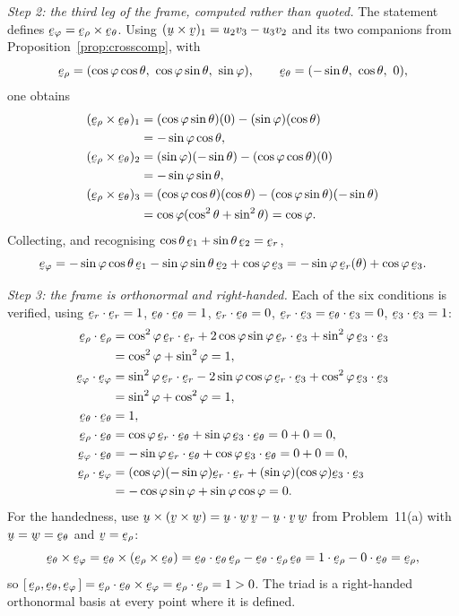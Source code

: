 \begin{solution}
\emph{Step 2: the third leg of the frame, computed rather than quoted.}
The statement defines $\beph=\berho\times\beth$. Using
$(\bu\times\bv)_{1}=u_{2}v_{3}-u_{3}v_{2}$ and its two companions from
Proposition~\ref{prop:crosscomp}, with
\[
   \berho=(\cos\varphi\cos\theta,\ \cos\varphi\sin\theta,\ \sin\varphi),
   \qquad
   \beth=(-\sin\theta,\ \cos\theta,\ 0),
\]
one obtains
\[
\begin{aligned}
   (\berho\times\beth)_{1}
   &=(\cos\varphi\sin\theta)(0)-(\sin\varphi)(\cos\theta)\\
   &=-\sin\varphi\cos\theta,\\
   (\berho\times\beth)_{2}
   &=(\sin\varphi)(-\sin\theta)-(\cos\varphi\cos\theta)(0)\\
   &=-\sin\varphi\sin\theta,\\
   (\berho\times\beth)_{3}
   &=(\cos\varphi\cos\theta)(\cos\theta)-(\cos\varphi\sin\theta)(-\sin\theta)\\
   &=\cos\varphi(\cos^{2}\theta+\sin^{2}\theta)=\cos\varphi .
\end{aligned}
\]
Collecting, and recognising $\cos\theta\,\be_{1}+\sin\theta\,\be_{2}=\ber$,
\[
   \beph=-\sin\varphi\cos\theta\,\be_{1}-\sin\varphi\sin\theta\,\be_{2}
         +\cos\varphi\,\be_{3}
        =-\sin\varphi\,\ber(\theta)+\cos\varphi\,\be_{3}.
\]

\emph{Step 3: the frame is orthonormal and right-handed.}
Each of the six conditions is verified, using
$\ip\ber\ber=1$, $\ip\beth\beth=1$, $\ip\ber\beth=0$,
$\ip\ber{\be_{3}}=\ip\beth{\be_{3}}=0$, $\ip{\be_{3}}{\be_{3}}=1$:
\[
\begin{aligned}
   \ip\berho\berho&=\cos^{2}\varphi\,\ip\ber\ber
     +2\cos\varphi\sin\varphi\,\ip\ber{\be_{3}}
     +\sin^{2}\varphi\,\ip{\be_{3}}{\be_{3}}\\
     &=\cos^{2}\varphi+\sin^{2}\varphi=1,\\
   \ip\beph\beph&=\sin^{2}\varphi\,\ip\ber\ber
     -2\sin\varphi\cos\varphi\,\ip\ber{\be_{3}}
     +\cos^{2}\varphi\,\ip{\be_{3}}{\be_{3}}\\
     &=\sin^{2}\varphi+\cos^{2}\varphi=1,\\
   \ip\beth\beth&=1,\\
   \ip\berho\beth&=\cos\varphi\,\ip\ber\beth
     +\sin\varphi\,\ip{\be_{3}}\beth=0+0=0,\\
   \ip\beph\beth&=-\sin\varphi\,\ip\ber\beth
     +\cos\varphi\,\ip{\be_{3}}\beth=0+0=0,\\
   \ip\berho\beph&=(\cos\varphi)(-\sin\varphi)\ip\ber\ber
     +(\sin\varphi)(\cos\varphi)\ip{\be_{3}}{\be_{3}}\\
     &=-\cos\varphi\sin\varphi+\sin\varphi\cos\varphi=0 .
\end{aligned}
\]
For the handedness, use
$\bu\times(\bv\times\bw)=\ip\bu\bw\,\bv-\ip\bu\bv\,\bw$ from
Problem~11(a) with $\bu=\bw=\beth$ and $\bv=\berho$:
\[
   \beth\times\beph=\beth\times(\berho\times\beth)
   =\ip\beth\beth\,\berho-\ip\beth\berho\,\beth
   =1\cdot\berho-0\cdot\beth=\berho,
\]
so $\tbox\berho\beth\beph=\ip\berho{\beth\times\beph}
=\ip\berho\berho=1>0$. The triad is a right-handed orthonormal basis at
every point where it is defined.


\end{solution}
